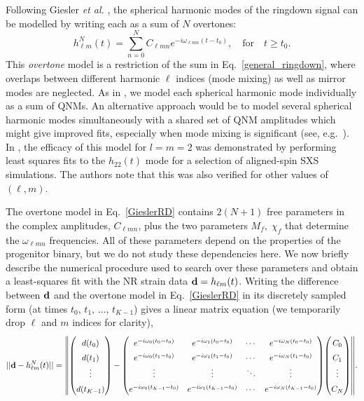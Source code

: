 Following Giesler \emph{et al.} \cite{Giesler:2019uxc}, the spherical harmonic modes of the ringdown signal can be modelled by writing each as a sum of $N$ overtones:
\begin{equation}\label{GieslerRD}
    h_{\ell m}^N(t) = \sum_{n=0}^N C_{\ell m n} e^{-i\omega_{\ell m n}(t-t_0)}, \quad \textrm{for} \quad t \geq t_0.
\end{equation}
This \emph{overtone} model is a restriction of the sum in Eq.~\ref{general_ringdown}, where overlaps between different harmonic $\ell$ indices (mode mixing) \cite{Berti:2014fga} as well as mirror modes are neglected. 
As in \cite{Giesler:2019uxc}, we model each spherical harmonic mode individually as a sum of QNMs. An alternative approach would be to model several spherical harmonic modes simultaneously with a shared set of QNM amplitudes which might give improved fits, especially when mode mixing is significant (see, e.g.\ \cite{Cook:2020otn}).
In \cite{Giesler:2019uxc}, the efficacy of this model for $l=m=2$ was demonstrated by performing least squares fits to the $h_{22}(t)$ mode for a selection of aligned-spin SXS simulations. The authors note that this was also verified for other values of $(\ell,m)$.

The overtone model in Eq.~\ref{GieslerRD} contains $2(N+1)$ free parameters in the complex amplitudes, $C_{\ell m n}$, plus the two parameters $M_f,\; \chi_f$ that determine the $\omega_{\ell m n}$ frequencies.
All of these parameters depend on the properties of the progenitor binary, but we do not study these dependencies here.
We now briefly describe the numerical procedure used to search over these parameters and obtain a least-squares fit with the NR strain data $\vb{d}=h_{\ell m}(t)$.
Writing the difference between $\vb{d}$ and the overtone model in Eq.~\ref{GieslerRD} in its discretely sampled form (at times $t_0,\, t_1,\, \dots,\, t_{K-1}$) gives a linear matrix equation (we temporarily drop $\ell$ and $m$ indices for clarity),
\begin{equation}\label{eq:linalg_fit}
\renewcommand*{\arraystretch}{1.5}
    ||\vb{d}-h^{N}_{\ell m}(t)|| = \norm{\mqty(d(t_0) \\ d(t_1) \\ \vdots \\ d(t_{K-1})) - 
    \mqty(e^{-i\omega_0(t_0-t_0)} & e^{-i\omega_1(t_0-t_0)} & \cdots & e^{-i\omega_N(t_0-t_0)} \\ 
          e^{-i\omega_0(t_1-t_0)} & e^{-i\omega_1(t_1-t_0)} & \cdots & e^{-i\omega_N(t_1-t_0)} \\ 
          \vdots & \vdots & \ddots & \vdots \\ 
          e^{-i\omega_0(t_{K-1}-t_0)} & e^{-i\omega_1(t_{K-1}-t_0)} & \cdots & e^{-i\omega_N(t_{K-1}-t_0)}) 
    \mqty(C_0 \\ C_1 \\ \vdots \\ C_N)}.
\end{equation}

